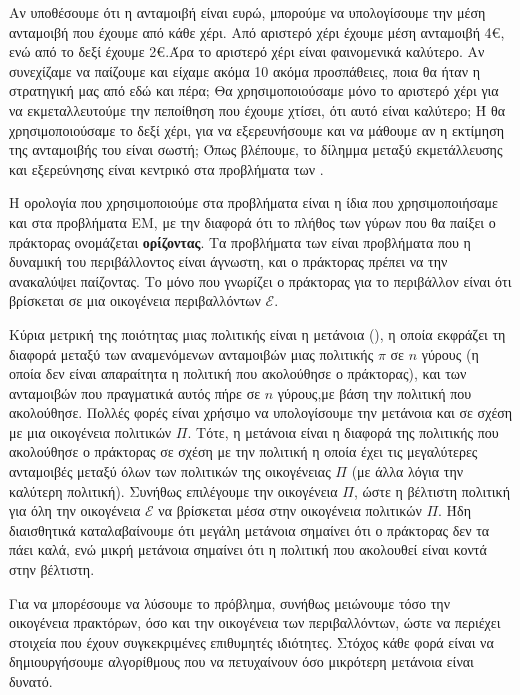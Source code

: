 Αν υποθέσουμε ότι η ανταμοιβή είναι ευρώ, μπορούμε να υπολογίσουμε την μέση ανταμοιβή που έχουμε από κάθε χέρι.
Από αριστερό χέρι έχουμε μέση ανταμοιβή 4€, ενώ από το δεξί έχουμε 2€.Άρα το αριστερό χέρι είναι φαινομενικά καλύτερο.
Aν συνεχίζαμε να παίζουμε και είχαμε ακόμα 10 ακόμα προσπάθειες, ποια θα ήταν η στρατηγική μας από εδώ και πέρα;
Θα χρησιμοποιούσαμε μόνο το αριστερό χέρι για να εκμεταλλευτούμε την πεποίθηση που έχουμε χτίσει, ότι αυτό είναι καλύτερο;
Ή θα χρησιμοποιούσαμε το δεξί χέρι, για να εξερευνήσουμε και να μάθουμε αν η εκτίμηση της ανταμοιβής του είναι σωστή;
Όπως βλέπουμε, το δίλημμα μεταξύ εκμετάλλευσης και εξερεύνησης είναι κεντρικό στα προβλήματα των .

Η ορολογία που χρησιμοποιούμε στα προβλήματα  είναι η ίδια που χρησιμοποιήσαμε και στα προβλήματα ΕΜ,
με την διαφορά ότι το πλήθος των γύρων που θα παίξει ο πράκτορας ονομάζεται \textbf{ορίζοντας}.
Τα προβλήματα των  είναι προβλήματα που η δυναμική του περιβάλλοντος είναι άγνωστη,
και ο πράκτορας πρέπει να την ανακαλύψει παίζοντας. Το μόνο που γνωρίζει ο πράκτορας για το περιβάλλον είναι ότι βρίσκεται
σε μια οικογένεια περιβαλλόντων $\mathcal{E}$.

Κύρια μετρική της ποιότητας μιας πολιτικής είναι η μετάνοια (), η οποία εκφράζει τη διαφορά μεταξύ των
αναμενόμενων ανταμοιβών μιας πολιτικής $π$ σε $n$ γύρους (η οποία δεν είναι απαραίτητα η πολιτική που ακολούθησε ο πράκτορας),
και των ανταμοιβών που πραγματικά αυτός πήρε σε $n$ γύρους,με βάση την πολιτική που ακολούθησε.
Πολλές φορές είναι χρήσιμο να υπολογίσουμε την μετάνοια και σε σχέση με μια οικογένεια πολιτικών $Π$.
Τότε, η μετάνοια είναι η διαφορά της πολιτικής που ακολούθησε ο πράκτορας σε σχέση με την πολιτική η οποία έχει τις μεγαλύτερες ανταμοιβές
μεταξύ όλων των πολιτικών της οικογένειας $Π$ (με άλλα λόγια την καλύτερη πολιτική). Συνήθως επιλέγουμε την οικογένεια $Π$, ώστε η βέλτιστη πολιτική
για όλη την οικογένεια $\mathcal{E}$ να βρίσκεται μέσα στην οικογένεια πολιτικών $Π$.
Ήδη διαισθητικά καταλαβαίνουμε ότι μεγάλη μετάνοια σημαίνει ότι ο πράκτορας δεν τα πάει καλά,
ενώ μικρή μετάνοια σημαίνει ότι η πολιτική που ακολουθεί είναι κοντά στην βέλτιστη.

Για να μπορέσουμε να λύσουμε το πρόβλημα, συνήθως μειώνουμε τόσο την οικογένεια πρακτόρων, όσο και την οικογένεια των περιβαλλόντων,
ώστε να περιέχει στοιχεία που έχουν συγκεκριμένες επιθυμητές ιδιότητες. Στόχος κάθε φορά είναι να δημιουργήσουμε αλγορίθμους που να
πετυχαίνουν όσο μικρότερη μετάνοια είναι δυνατό.

